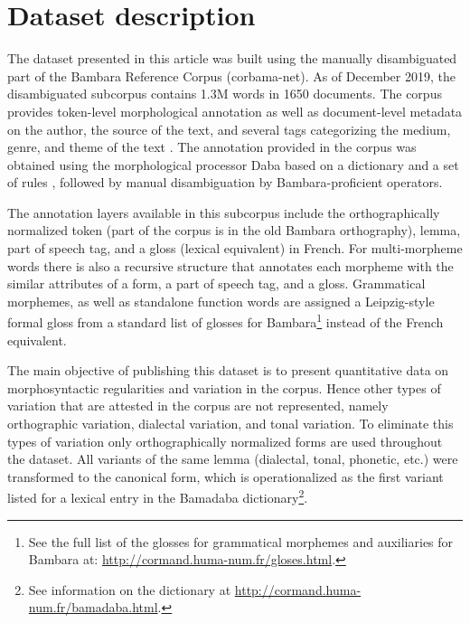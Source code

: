 \documentclass[12pt]{article}
\begin{document}


\section{Dataset description}
\label{sec:data}

The dataset presented in this article was built using the manually
disambiguated part of the Bambara Reference Corpus (corbama-net). As
of December 2019, the disambiguated subcorpus contains 1.3M words in
1650 documents. The corpus provides token-level morphological
annotation as well as document-level metadata on the author, the
source of the text, and several tags categorizing the medium, genre,
and theme of the text \autocite[on metadata, see for
details:][]{davydov2010towards}. The annotation provided in the corpus
was obtained using the morphological processor Daba based on a
dictionary and a set of rules \autocite{maslinsky2014daba}, followed
by manual disambiguation by Bambara-proficient
operators.

The annotation layers available in this subcorpus include the
orthographically normalized token (part of the corpus is in the
old Bambara orthography), lemma, part of speech
tag, and a gloss (lexical equivalent) in French. For multi-morpheme
words there is also a recursive structure that annotates each morpheme
with the similar attributes of a form, a part of speech tag, and a
gloss. Grammatical morphemes, as well as standalone function words are
assigned a Leipzig-style formal gloss from a standard list of glosses
for Bambara\footnote{See the full list of the glosses for grammatical
  morphemes and auxiliaries for Bambara at:
  \url{http://cormand.huma-num.fr/gloses.html}.} instead of the French
equivalent.

The main objective of publishing this dataset is to present
quantitative data on morphosyntactic regularities and variation in the
corpus. Hence other types of variation that are attested in the corpus
are not represented, namely orthographic variation, dialectal
variation, and tonal variation. To eliminate this types of variation
only orthographically normalized forms are used throughout the
dataset. All variants of the same lemma (dialectal, tonal, phonetic,
etc.) were transformed to the canonical form, which is
operationalized as the first variant listed for a lexical entry in the
Bamadaba dictionary\footnote{See information on the dictionary at \url{http://cormand.huma-num.fr/bamadaba.html}.}.
\end{document}
